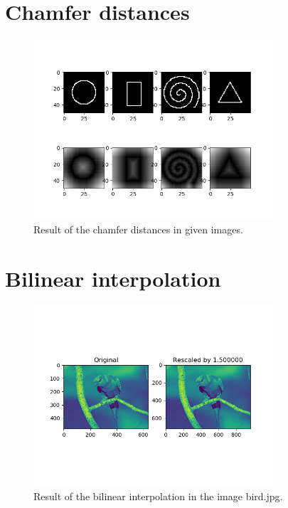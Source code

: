 \documentclass[12pt]{article}
\begin{document}
\section{Chamfer distances}
\begin{figure}[!htb]
  \centering
  \includegraphics[width=0.8\textwidth]{pics/hw1_ex3_template_chamfer.png}
  \caption{Result of the chamfer distances in given images.}
  \end{figure}
\newpage
\section{Bilinear interpolation}
\begin{figure}[!htb]
  \centering
  \includegraphics[width=0.8\textwidth]{pics/hw1_ex4_template_bilinear_interp.png}
  \caption{Result of the bilinear interpolation in the image bird.jpg.}
  \end{figure}
\end{document}
